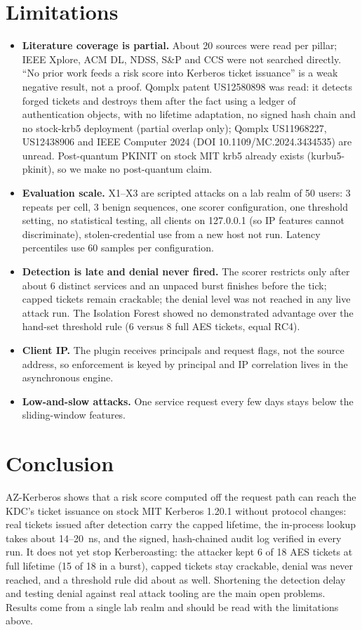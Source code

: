 \documentclass[conference]{IEEEtran}
\begin{document}
\section{Limitations}
\begin{itemize}
\item \textbf{Literature coverage is partial.} About 20 sources were read per pillar; IEEE Xplore, ACM DL, NDSS, S\&P and CCS were not searched directly. ``No prior work feeds a risk score into Kerberos ticket issuance'' is a weak negative result, not a proof. Qomplx patent US12580898 was read: it detects forged tickets and destroys them after the fact using a ledger of authentication objects, with no lifetime adaptation, no signed hash chain and no stock-krb5 deployment (partial overlap only); Qomplx US11968227, US12438906 and IEEE Computer 2024 (DOI 10.1109/MC.2024.3434535) are unread. Post-quantum PKINIT on stock MIT krb5 already exists (kurbu5-pkinit), so we make no post-quantum claim.
\item \textbf{Evaluation scale.} X1--X3 are scripted attacks on a lab realm of 50 users: 3 repeats per cell, 3 benign sequences, one scorer configuration, one threshold setting, no statistical testing, all clients on 127.0.0.1 (so IP features cannot discriminate), stolen-credential use from a new host not run. Latency percentiles use 60 samples per configuration.
\item \textbf{Detection is late and denial never fired.} The scorer restricts only after about 6 distinct services and an unpaced burst finishes before the tick; capped tickets remain crackable; the denial level was not reached in any live attack run. The Isolation Forest showed no demonstrated advantage over the hand-set threshold rule (6 versus 8 full AES tickets, equal RC4).
\item \textbf{Client IP.} The plugin receives principals and request flags, not the source address, so enforcement is keyed by principal and IP correlation lives in the asynchronous engine.
\item \textbf{Low-and-slow attacks.} One service request every few days stays below the sliding-window features.
\end{itemize}

\section{Conclusion}
AZ-Kerberos shows that a risk score computed off the request path can reach the KDC's ticket issuance on stock MIT Kerberos 1.20.1 without protocol changes: real tickets issued after detection carry the capped lifetime, the in-process lookup takes about 14--20~ns, and the signed, hash-chained audit log verified in every run. It does not yet stop Kerberoasting: the attacker kept 6 of 18 AES tickets at full lifetime (15 of 18 in a burst), capped tickets stay crackable, denial was never reached, and a threshold rule did about as well. Shortening the detection delay and testing denial against real attack tooling are the main open problems. Results come from a single lab realm and should be read with the limitations above.
\end{document}
